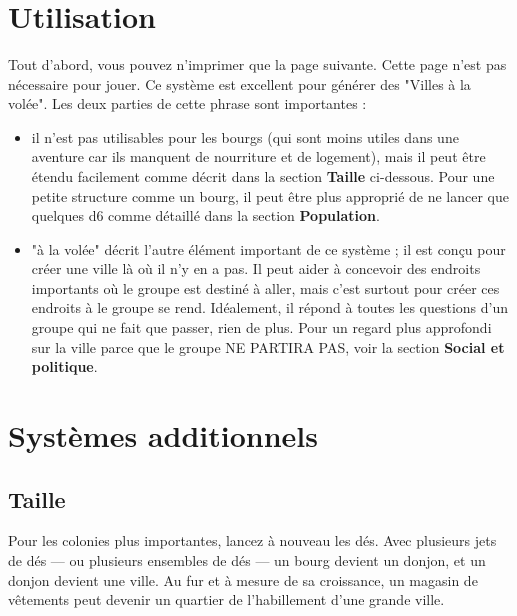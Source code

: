 \documentclass{article}
\begin{document}
\title{\vspace{-0.5cm}{\Huge One-Roll Towns} \vspace{-1cm}}

\date{}

\maketitle

\section*{Utilisation}
Tout d'abord, vous pouvez n’imprimer que la page suivante. Cette page n'est pas nécessaire pour jouer.
Ce système est excellent pour générer des "Villes à la volée". Les deux parties de cette phrase sont importantes :

\begin{itemize}
	\item il n’est pas utilisables pour les bourgs (qui sont moins utiles dans une aventure car ils manquent de nourriture et de logement), mais il peut être étendu facilement comme décrit dans la section \textbf{Taille} ci-dessous. Pour une petite structure comme un bourg, il peut être plus approprié de ne lancer que quelques d6 comme détaillé dans la section \textbf{Population}.
	\item "à la volée" décrit l'autre élément important de ce système ; il est conçu pour créer une ville là où il n'y en a pas. Il peut aider à concevoir des endroits importants où le groupe est destiné à aller, mais c'est surtout pour créer ces endroits à le groupe se rend. Idéalement, il répond à toutes les questions d'un groupe qui ne fait que passer, rien de plus. Pour un regard plus approfondi sur la ville parce que le groupe NE PARTIRA PAS, voir la section \textbf{Social et politique}.
\end{itemize}

\section*{Systèmes additionnels}

\subsection*{Taille}
Pour les colonies plus importantes, lancez à nouveau les dés. Avec plusieurs jets de dés --- ou plusieurs ensembles de dés --- un bourg devient un donjon, et un donjon devient une ville. Au fur et à mesure de sa croissance, un magasin de vêtements peut devenir un quartier de l'habillement d'une grande ville.
\end{document}
